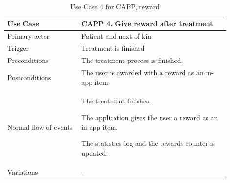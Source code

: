\begin{table}
	\begin{center}
	    \begin{tabular}{|p{0.3\linewidth}|p{0.6\linewidth}|}
	    \hline
	    Use Case & CAPP 4. Give reward after treatment \\ \hline
	    Primary actor & Patient and next-of-kin \\ \hline
	    Trigger & Treatment is finished \\ \hline
	    Preconditions & The treatment process is finished. \\ \hline
	    Postconditions & The user is awarded with a reward as an in-app item\\ \hline
	    Normal flow of events & 
	    	\begin{tabulenum}
	    	  \item The treatment finishes.
	    	  \item The application gives the user a reward as an in-app item.
	    	  \item The statistics log and the rewards counter is updated.
	    	\end{tabulenum} \\ \hline
	    Variations & -- \\ \hline
	    \end{tabular}
   	\end{center}
    \caption{Use Case 4 for CAPP, reward}
    \label{tab:cappUseCase4}
\end{table}